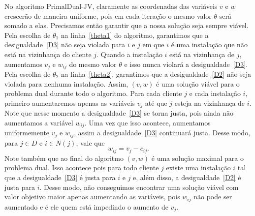No algoritmo {\sc PrimalDual-JV}, claramente as coordenadas das variáveis $v$ e $w$ crescerão de maneira uniforme, pois em cada iteração o mesmo valor $\theta$ será somado a elas. Precisamos então garantir que a nossa solução seja sempre viável. Pela escolha de $\theta_1$ na linha~\ref{theta1} do algoritmo, garantimos que a desigualdade~\eqref{D3} não seja violada para $i$ e $j$ em que $i$ é uma instalação que não está na vizinhança do cliente $j$. Quando a instalação $i$ está na vizinhança de $j$, aumentamos $v_j$ e $w_{ij}$ do mesmo valor $\theta$ e isso nunca violará a desigualdade~\eqref{D3}. 
Pela escolha de $\theta_2$ na linha~\ref{theta2}, garantimos que a desigualdade~\eqref{D2} não seja violada para nenhuma instalação. 
Assim, $(v,w)$ é uma solução viável para o problema dual durante todo o algoritmo.
Para cada cliente $j$ e cada instalação $i$, primeiro aumentaremos apenas as variáveis $v_j$ até que $j$ esteja na vizinhança de $i$. Note que nesse momento a desigualdade~\eqref{D3} se torna justa, pois ainda não aumentamos a variável $w_{ij}$. Uma vez que isso acontece, aumentamos uniformemente $v_j$ e $w_{ij}$, assim a desigualdade~\eqref{D3} continuará justa. Desse modo, para $j \in D$ e $i \in N(j)$, vale que 
\begin{equation}\label{Djusta:*}  
w_{ij} = v_j - c_{ij}.
\end{equation}
Note também que ao final do algoritmo $(v,w)$ é uma solução maximal para o problema dual. Isso acontece pois para todo cliente $j$ existe uma instalação $i$ tal que a desigualdade~\eqref{D3} é justa para $i$ e $j$ e, além disso, a desigualdade~\eqref{D2} é justa para $i$. Desse modo, não conseguimos encontrar uma solução viável com valor objetivo maior apenas aumentando as variáveis, pois $w_{ij}$ não pode ser aumentado e é ele quem está impedindo o aumento de $v_j$.

